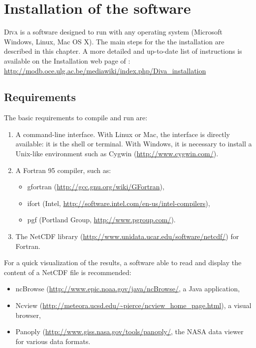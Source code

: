 \chapter{Installation of the software}

\lettrine[lines=2]{D}{iva} is a software designed to run with any operating system (Microsoft Windows, Linux, Mac OS X). The main steps for the the installation are described in this chapter. A more detailed and up-to-date list of instructions is available on the Installation web page of \diva: \url{http://modb.oce.ulg.ac.be/mediawiki/index.php/Diva_installation}


\minitoc

\newpage

\section{Requirements}

The basic requirements to compile and run \diva are:
\begin{enumerate}
\item A command-line interface. With Linux or Mac, the interface is directly available: it is the shell or terminal. With Windows, it is necessary to install a Unix-like environment such as Cygwin (\url{http://www.cygwin.com/}).
\item A Fortran 95 compiler, such as:
\begin{itemize}
\item gfortran (\url{http://gcc.gnu.org/wiki/GFortran}),
\item ifort (Intel\textsuperscript{\textregistered}, \url{http://software.intel.com/en-us/intel-compilers}),
\item pgf (Portland Group, \url{http://www.pgroup.com/}).
\end{itemize}    
\item The NetCDF library (\url{http://www.unidata.ucar.edu/software/netcdf/}) for Fortran.
\end{enumerate}

For a quick visualization of the results, a software able to read and display the content of a NetCDF  file is recommended:
\begin{itemize}
\item ncBrowse (\url{http://www.epic.noaa.gov/java/ncBrowse/}, a Java application,
\item Ncview (\url{http://meteora.ucsd.edu/~pierce/ncview_home_page.html}), a visual browser, 
\item Panoply (\url{http://www.giss.nasa.gov/tools/panoply/}, the NASA data viewer for various data formats.
\end{itemize}


